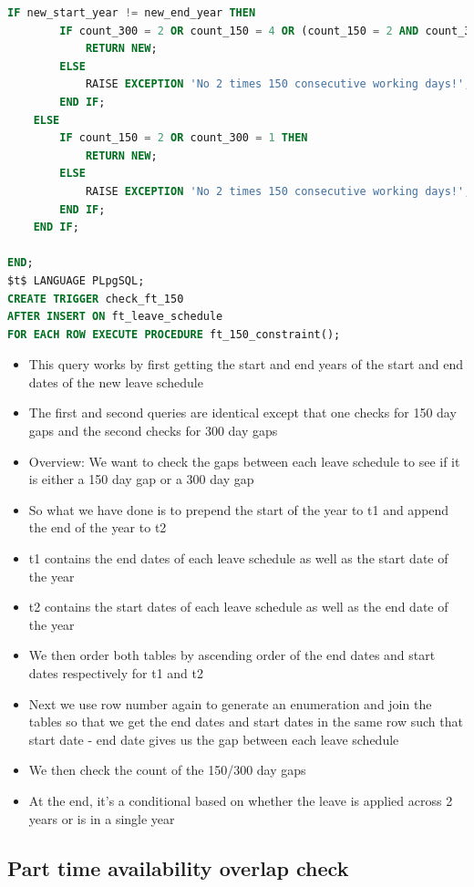 \documentclass[
  paper=a4,
  ,captions=tableheading
]{scrartcl}
\providecommand{\tightlist}{%
  \setlength{\itemsep}{0pt}\setlength{\parskip}{0pt}}
\begin{document}
\begin{lstlisting}[language=SQL]
    IF new_start_year != new_end_year THEN
        IF count_300 = 2 OR count_150 = 4 OR (count_150 = 2 AND count_300 = 1) THEN
            RETURN NEW;
        ELSE
            RAISE EXCEPTION 'No 2 times 150 consecutive working days!';
        END IF;
    ELSE
        IF count_150 = 2 OR count_300 = 1 THEN
            RETURN NEW;
        ELSE
            RAISE EXCEPTION 'No 2 times 150 consecutive working days!';
        END IF;
    END IF;

END;
$t$ LANGUAGE PLpgSQL;
CREATE TRIGGER check_ft_150
AFTER INSERT ON ft_leave_schedule
FOR EACH ROW EXECUTE PROCEDURE ft_150_constraint();
\end{lstlisting}

\begin{itemize}
\tightlist
\item
  This query works by first getting the start and end years of the start
  and end dates of the new leave schedule
\item
  The first and second queries are identical except that one checks for
  150 day gaps and the second checks for 300 day gaps
\item
  Overview: We want to check the gaps between each leave schedule to see
  if it is either a 150 day gap or a 300 day gap
\item
  So what we have done is to prepend the start of the year to t1 and
  append the end of the year to t2
\item
  t1 contains the end dates of each leave schedule as well as the start
  date of the year
\item
  t2 contains the start dates of each leave schedule as well as the end
  date of the year
\item
  We then order both tables by ascending order of the end dates and
  start dates respectively for t1 and t2
\item
  Next we use row number again to generate an enumeration and join the
  tables so that we get the end dates and start dates in the same row
  such that start date - end date gives us the gap between each leave
  schedule
\item
  We then check the count of the 150/300 day gaps
\item
  At the end, it's a conditional based on whether the leave is applied
  across 2 years or is in a single year
\end{itemize}

\hypertarget{part-time-availability-overlap-check}{%
\subsection{Part time availability overlap
check}\label{part-time-availability-overlap-check}}
\end{document}
